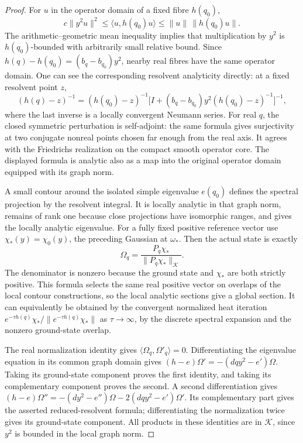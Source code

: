 \begin{proof}
For $u$ in the operator domain of a fixed fibre $h(q_0)$,
\[
 c\|y^2u\|^2\leq\langle u,h(q_0)u\rangle
                  \leq\|u\|\,\|h(q_0)u\|.
\]
The arithmetic--geometric mean inequality implies that multiplication
by $y^2$ is $h(q_0)$-bounded with arbitrarily small relative bound.
Since $h(q)-h(q_0)=(b_q-b_{q_0})y^2$, nearby real fibres have the
same operator domain. One can see the corresponding resolvent
analyticity directly: at a fixed resolvent point $z$,
\[
 (h(q)-z)^{-1}=(h(q_0)-z)^{-1}
 \bigl[I+(b_q-b_{q_0})y^2(h(q_0)-z)^{-1}\bigr]^{-1},
\]
where the last inverse is a locally convergent Neumann series.
For real $q$, the closed symmetric perturbation is self-adjoint:
the same formula gives surjectivity at two conjugate nonreal
points chosen far enough from the real axis. It agrees with the
Friedrichs realization on the compact smooth operator core.
The displayed formula is analytic also as a map into the original
operator domain equipped with its graph norm.

A small contour around the isolated simple eigenvalue $e(q_0)$
defines the spectral projection by the resolvent integral.
It is locally analytic in that graph norm, remains of rank one
because close projections have isomorphic ranges, and gives the
locally analytic eigenvalue. For a fully fixed positive reference
vector use $\chi_*(y)=\chi_0(y)$, the preceding Gaussian at
$\omega_*$. Then the actual state is exactly
\begin{equation}\label{fq:exact-state}
 \Omega_q=\frac{P_q\chi_*}{\|P_q\chi_*\|_{\mathscr K}}.
\end{equation}
The denominator is nonzero because the ground state and $\chi_*$
are both strictly positive. This formula selects the same real
positive vector on overlaps of the local contour constructions,
so the local analytic sections give a global section.
It can equivalently be obtained by the convergent normalized
heat iteration $e^{-\tau h(q)}\chi_*/\|e^{-\tau h(q)}\chi_*\|$
as $\tau\to\infty$, by the discrete spectral expansion and the
nonzero ground-state overlap.

The real normalization identity gives
$\langle\Omega_q,\Omega'_q\rangle=0$. Differentiating the
eigenvalue equation in its common graph domain gives
$(h-e)\Omega'=-(dq y^2-e')\Omega$. Taking its ground-state
component proves the first identity, and taking its complementary
component proves the second. A second differentiation gives
$(h-e)\Omega''=-(dy^2-e'')\Omega-2(dq y^2-e')\Omega'$.
Its complementary part gives the asserted reduced-resolvent
formula; differentiating the normalization twice gives its
ground-state component. All products in these identities are
in $\mathscr K$, since $y^2$ is bounded in the local graph norm.
\end{proof}


